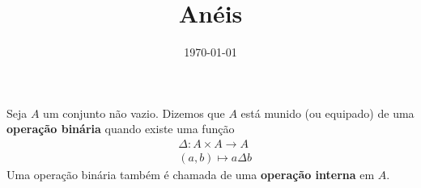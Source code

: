 \documentclass{beamer}
\title{An\'eis}
\author[\autor]{\autor}
\institute[\instituto]{\instituto}
\date{\today}
\begin{document}
    \begin{frame}
        \maketitle
    \end{frame}

    
    \begin{frame}
        \begin{definicao}
            Seja $A$ um conjunto n{\~a}o vazio. Dizemos que $A$ est{\'a} munido (ou equipado) de uma \textbf{opera{\c c}{\~a}o bin{\'a}ria} quando existe uma fun{\c c}{\~a}o
            \begin{align*}
                &\Delta : A \times A \to A\\
                &(a,b) \longmapsto a\Delta b        
            \end{align*}
            Uma opera{\c c}{\~a}o bin{\'a}ria tamb{\'e}m {\'e} chamada de uma \textbf{opera{\c c}{\~a}o interna} em $A$.
        \end{definicao}
    \end{frame}
\end{document}
